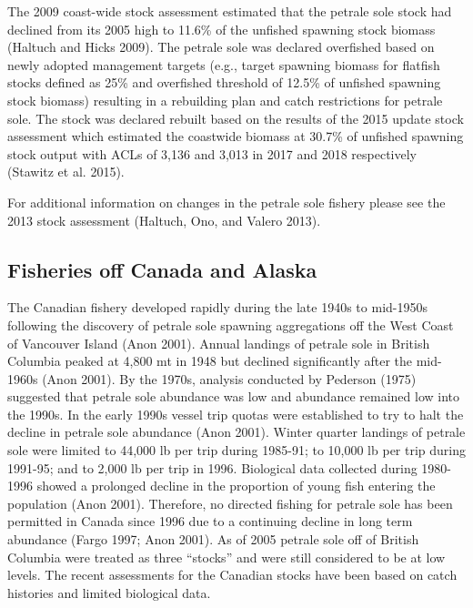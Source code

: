 \documentclass[11pt,
  english,
  letterpaper,
]{article}
\begin{document}
The 2009 coast-wide stock assessment estimated that the petrale sole stock had declined from its 2005 high to 11.6\% of the unfished spawning stock biomass (Haltuch and Hicks 2009). The petrale sole was declared overfished based on newly adopted management targets (e.g., target spawning biomass for flatfish stocks defined as 25\% and overfished threshold of 12.5\% of unfished spawning stock biomass) resulting in a rebuilding plan and catch restrictions for petrale sole. The stock was declared rebuilt based on the results of the 2015 update stock assessment which estimated the coastwide biomass at 30.7\% of unfished spawning stock output with ACLs of 3,136 and 3,013 in 2017 and 2018 respectively (Stawitz et al. 2015).

For additional information on changes in the petrale sole fishery please see the 2013 stock assessment (Haltuch, Ono, and Valero 2013).

\hypertarget{fisheries-off-canada-and-alaska}{%
\subsection{Fisheries off Canada and Alaska}\label{fisheries-off-canada-and-alaska}}

The Canadian fishery developed rapidly during the late 1940s to mid-1950s following the discovery of petrale sole spawning aggregations off the West Coast of Vancouver Island (Anon 2001). Annual landings of petrale sole in British Columbia peaked at 4,800 mt in 1948 but declined significantly after the mid-1960s (Anon 2001). By the 1970s, analysis conducted by Pederson (1975) suggested that petrale sole abundance was low and abundance remained low into the 1990s. In the early 1990s vessel trip quotas were established to try to halt the decline in petrale sole abundance (Anon 2001). Winter quarter landings of petrale sole were limited to 44,000 lb per trip during 1985-91; to 10,000 lb per trip during 1991-95; and to 2,000 lb per trip in 1996. Biological data collected during 1980-1996 showed a prolonged decline in the proportion of young fish entering the population (Anon 2001). Therefore, no directed fishing for petrale sole has been permitted in Canada since 1996 due to a continuing decline in long term abundance (Fargo 1997; Anon 2001). As of 2005 petrale sole off of British Columbia were treated as three ``stocks'' and were still considered to be at low levels. The recent assessments for the Canadian stocks have been based on catch histories and limited biological data.
\end{document}
